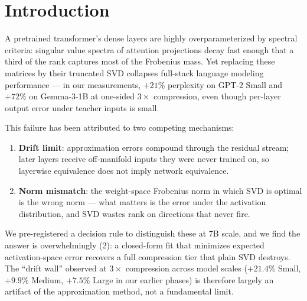 \documentclass[11pt]{article}
\begin{document}
\section{Introduction}

A pretrained transformer's dense layers are highly overparameterized by
spectral criteria: singular value spectra of attention projections decay
fast enough that a third of the rank captures most of the Frobenius mass.
Yet replacing these matrices by their truncated SVD collapses full-stack
language modeling performance --- in our measurements, $+21\%$ perplexity on
GPT-2 Small and $+72\%$ on Gemma-3-1B at one-sided $3\times$ compression,
even though per-layer output error under teacher inputs is small.

This failure has been attributed to two competing mechanisms:
\begin{enumerate}[label=(\arabic*)]
  \item \textbf{Drift limit}: approximation errors compound through the
    residual stream; later layers receive off-manifold inputs they were
    never trained on, so layerwise equivalence does not imply network
    equivalence.
  \item \textbf{Norm mismatch}: the weight-space Frobenius norm in which SVD
    is optimal is the wrong norm --- what matters is the error under the
    activation distribution, and SVD wastes rank on directions that never
    fire.
\end{enumerate}
We pre-registered a decision rule to distinguish these at 7B scale, and we
find the answer is overwhelmingly (2): a closed-form fit that minimizes
expected activation-space error recovers a full compression tier that plain
SVD destroys. The ``drift wall'' observed at $3\times$ compression across
model scales ($+21.4\%$ Small, $+9.9\%$ Medium, $+7.5\%$ Large in our
earlier phases) is therefore largely an artifact of the approximation
method, not a fundamental limit.
\end{document}
